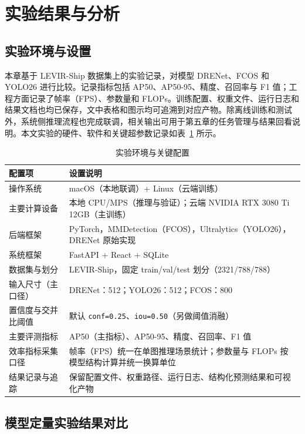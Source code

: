 \section{实验结果与分析}\label{sec:experiment}

\subsection{实验环境与设置}

本章基于 LEVIR-Ship 数据集上的实验记录，对模型 DRENet、FCOS 和 YOLO26 进行比较。记录指标包括 AP50、AP50-95、精度、召回率与 F1 值；工程方面记录了帧率（FPS）、参数量和 FLOPs。训练配置、权重文件、运行日志和结果文档也均已保存，文中表格和图示均可追溯到对应产物。除离线训练和测试外，系统侧推理流程也完成联调，相关输出可用于第五章的任务管理与结果回看说明。本文实验的硬件、软件和关键超参数记录如表~\ref{tab:ch4_env} 所示。

\begin{table}[htbp]
  \centering
  \small
  \caption{实验环境与关键配置}
  \label{tab:ch4_env}
  \begin{tabular}{p{3.0cm}p{9.0cm}}
    \toprule
    配置项 & 设置说明 \\
    \midrule
    操作系统 & macOS（本地联调）+ Linux（云端训练） \\
    主要计算设备 & 本地 CPU/MPS（推理与验证）；云端 NVIDIA RTX 3080 Ti 12GB（主训练） \\
    后端框架 & PyTorch，MMDetection（FCOS），Ultralytics（YOLO26），DRENet 原始实现 \\
    系统框架 & FastAPI + React + SQLite \\
    数据集与划分 & LEVIR-Ship，固定 train/val/test 划分（2321/788/788） \\
    输入尺寸（主口径） & DRENet：512；YOLO26：512；FCOS：800 \\
    置信度与交并比阈值 & 默认 \texttt{conf=0.25}、\texttt{iou=0.50}（另做阈值消融） \\
    主要评测指标 & AP50（主指标）、AP50-95、精度、召回率、F1 值 \\
    效率指标采集口径 & 帧率（FPS）统一在单图推理场景统计；参数量与 FLOPs 按模型结构计算并统一换算单位 \\
    结果记录与追踪 & 保留配置文件、权重路径、运行日志、结构化预测结果和可视化产物 \\
    \bottomrule
  \end{tabular}
\end{table}

\subsection{模型定量实验结果对比}

